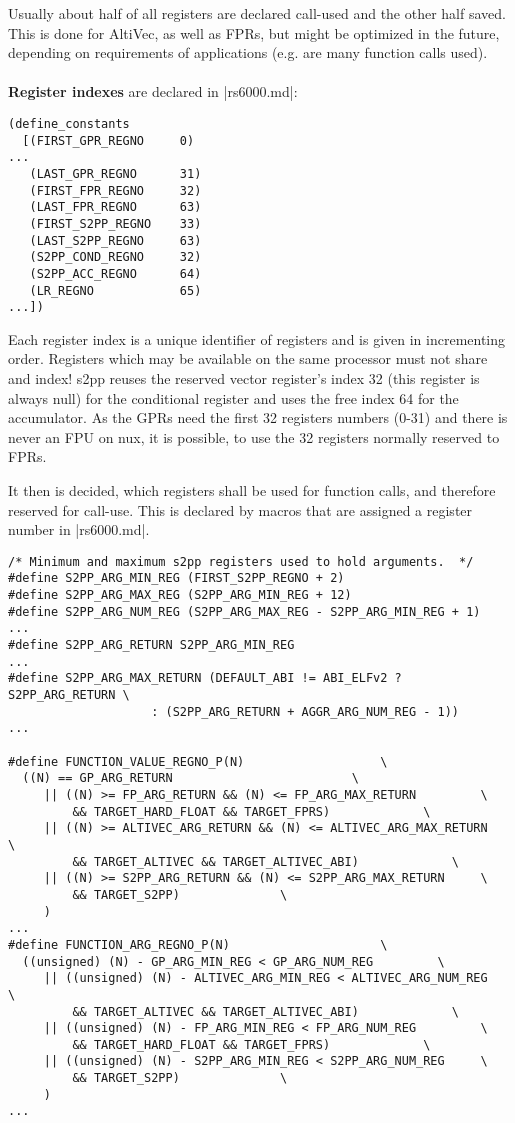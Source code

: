 Usually about half of all registers are declared call-used and the other half saved.
This is done for AltiVec, as well as \acp{FPR}, but might be optimized in the future, depending on requirements of applications (e.g. are many function calls used).
\\
\\
\textbf{Register indexes} are declared in |rs6000.md|:
\begin{lstlisting}
(define_constants
  [(FIRST_GPR_REGNO     0)
...
   (LAST_GPR_REGNO      31)
   (FIRST_FPR_REGNO     32)
   (LAST_FPR_REGNO      63)
   (FIRST_S2PP_REGNO    33)
   (LAST_S2PP_REGNO     63)
   (S2PP_COND_REGNO     32)
   (S2PP_ACC_REGNO      64)
   (LR_REGNO            65)
...])
\end{lstlisting}
Each register index is a unique identifier of registers and is given in incrementing order.
Registers which may be available on the same processor must not share and index!
\ac{s2pp} reuses the reserved vector register's index 32 (this register is always null) for the conditional register and uses the free index 64 for the accumulator.
As the GPRs need the first 32 registers numbers (0-31) and there is never an FPU on nux, it is possible, to use the 32 registers normally reserved to FPRs.

It then is decided, which registers shall be used for function calls, and therefore reserved for call-use.
This is declared by macros that are assigned a register number in |rs6000.md|.
\begin{lstlisting}
/* Minimum and maximum s2pp registers used to hold arguments.  */
#define S2PP_ARG_MIN_REG (FIRST_S2PP_REGNO + 2)
#define S2PP_ARG_MAX_REG (S2PP_ARG_MIN_REG + 12)
#define S2PP_ARG_NUM_REG (S2PP_ARG_MAX_REG - S2PP_ARG_MIN_REG + 1)
...
#define S2PP_ARG_RETURN S2PP_ARG_MIN_REG
...
#define S2PP_ARG_MAX_RETURN (DEFAULT_ABI != ABI_ELFv2 ? S2PP_ARG_RETURN \
                    : (S2PP_ARG_RETURN + AGGR_ARG_NUM_REG - 1))
...

#define FUNCTION_VALUE_REGNO_P(N)                   \
  ((N) == GP_ARG_RETURN                         \
     || ((N) >= FP_ARG_RETURN && (N) <= FP_ARG_MAX_RETURN         \
         && TARGET_HARD_FLOAT && TARGET_FPRS)             \
     || ((N) >= ALTIVEC_ARG_RETURN && (N) <= ALTIVEC_ARG_MAX_RETURN   \
         && TARGET_ALTIVEC && TARGET_ALTIVEC_ABI)             \
     || ((N) >= S2PP_ARG_RETURN && (N) <= S2PP_ARG_MAX_RETURN     \
         && TARGET_S2PP)              \
     )
...
#define FUNCTION_ARG_REGNO_P(N)                     \
  ((unsigned) (N) - GP_ARG_MIN_REG < GP_ARG_NUM_REG         \
     || ((unsigned) (N) - ALTIVEC_ARG_MIN_REG < ALTIVEC_ARG_NUM_REG   \
         && TARGET_ALTIVEC && TARGET_ALTIVEC_ABI)             \
     || ((unsigned) (N) - FP_ARG_MIN_REG < FP_ARG_NUM_REG         \
         && TARGET_HARD_FLOAT && TARGET_FPRS)             \
     || ((unsigned) (N) - S2PP_ARG_MIN_REG < S2PP_ARG_NUM_REG     \
         && TARGET_S2PP)              \
     )
...
\end{lstlisting}

